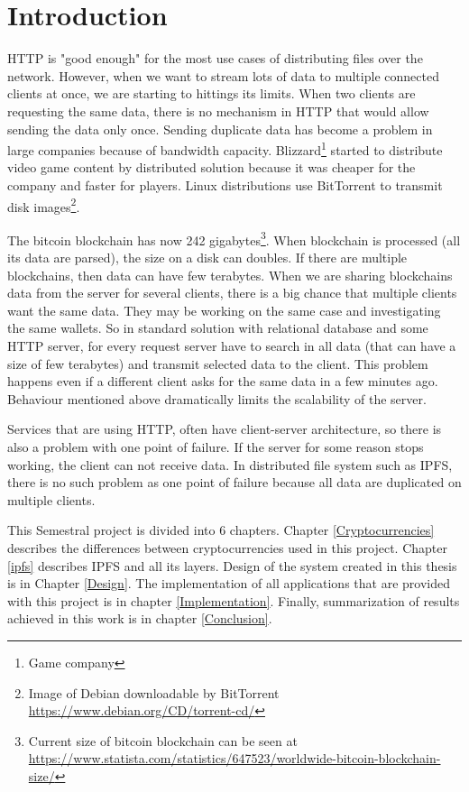 \chapter{Introduction}


HTTP is "good enough" for the most use cases of distributing files over the network. However, when we want to stream lots of data to multiple connected clients at once, we are starting to hittings its limits. When two clients are requesting the same data, there is no mechanism in HTTP that would allow sending the data only once. Sending duplicate data has become a problem in large companies because of bandwidth capacity. Blizzard\footnote{Game company} started to distribute video game content by distributed solution because it was cheaper for the company and faster for players\cite{BigDataInVideoGames}. Linux distributions use BitTorrent to transmit disk images\footnote{Image of Debian downloadable by BitTorrent \url{https://www.debian.org/CD/torrent-cd/}}.

The bitcoin blockchain has now 242 gigabytes\footnote{Current size of bitcoin blockchain can be seen at \url{https://www.statista.com/statistics/647523/worldwide-bitcoin-blockchain-size/}}. When blockchain is processed (all its data are parsed), the size on a disk can doubles. If there are multiple blockchains, then data can have few terabytes. When we are sharing blockchains data from the server for several clients, there is a big chance that multiple clients want the same data. They may be working on the same case and investigating the same wallets.  So in standard solution with relational database and some HTTP server, for every request server have to search in all data (that can have a size of few terabytes) and transmit selected data to the client. This problem happens even if a different client asks for the same data in a few minutes ago. Behaviour mentioned above dramatically limits the scalability of the server.

Services that are using HTTP, often have client-server architecture, so there is also a problem with one point of failure. If the server for some reason stops working, the client can not receive data. In distributed file system such as IPFS, there is no such problem as one point of failure because all data are duplicated on multiple clients.

This Semestral project is divided into 6 chapters. Chapter \ref{Cryptocurrencies} describes the differences between cryptocurrencies used in this project. Chapter \ref{ipfs} describes IPFS and all its layers. Design of the system created in this thesis is in Chapter \ref{Design}. The implementation of all applications that are provided with this project is in chapter \ref{Implementation}. Finally, summarization of results achieved in this work is in chapter \ref{Conclusion}.